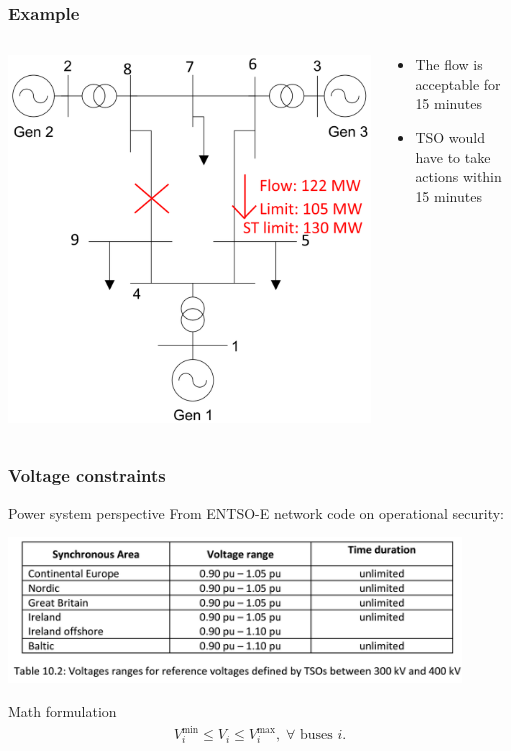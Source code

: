\documentclass[compress]{beamer}
\begin{document}
\begin{frame}
\frametitle{Example}
\begin{columns}
  \begin{column}{0.5\textwidth}
\includegraphics[width=\textwidth]{Figs/ieee9_fault_line_8-9_stratings.png}
  \end{column}
  \begin{column}{0.5\textwidth}
    \begin{itemize}
    \item The flow is acceptable for 15 minutes
    \item TSO would have to take actions within 15 minutes
    \end{itemize}
  \end{column}
\end{columns}
\end{frame}

\begin{frame}
  \frametitle{Voltage constraints}
  \begin{block}{Power system perspective}
From ENTSO-E network code on operational security:

\includegraphics[width=0.9\textwidth]{Figs/ENTSOE-NCOS-VoltageRanges.png}    \end{block}
\begin{block}{Math formulation}
  \begin{align*}
  V_i^{\text{min}} \leq V_i \leq V_i^{\text{max}}, \; \forall \text{ buses } i.
  \end{align*}
\end{block}
\end{frame}
\end{document}
